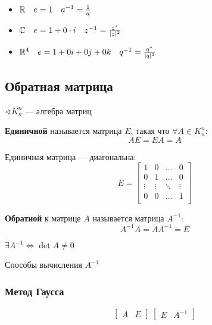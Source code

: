 \begin{example}
    \begin{itemize}
        \item $\mathbb{R} \quad e = 1 \quad a^{-1} = \frac{1}{a}$
        \item $\mathbb{C} \quad e = 1 + 0\cdot i \quad z^{-1}=\frac{z^*}{|z|^2}$
        \item $\mathbb{R}^4 \quad e = 1 + 0i + 0j + 0k \quad q^{-1}=\frac{q^*}{|q|^2}$
    \end{itemize}
\end{example}

\subsection{Обратная матрица}

$\sphericalangle K_n^n$ --- алгебра матриц
\begin{definition}
    \textbf{Единичной} называется матрица $E$, такая что $\forall A\in K_n^n$:
    $$AE=EA=A$$
\end{definition}
\begin{remark}
    Единичная матрица --- диагональна:
    $$E=\begin{bmatrix}
        1 & 0 & \ldots & 0 \\
        0 & 1 & \ldots & 0 \\
        \vdots & \vdots & \ddots & \vdots \\
        0 & 0 & \ldots & 1 \\
    \end{bmatrix}$$
\end{remark}

\begin{definition}
    \textbf{Обратной} к матрице $A$ называется матрица $A^{-1}$:
    $$A^{-1}A=AA^{-1}=E$$
\end{definition}

\begin{theorem}
    $\exists A^{-1} \Leftrightarrow \det A \not=0$
\end{theorem}

Способы вычисления $A^{-1}$

\subsubsection{Метод Гаусса}

$$\left[\begin{array}{c|c}
    A & E
\end{array}\right] ~ \left[\begin{array}{c|c}
    E & A^{-1}
\end{array}\right]$$

